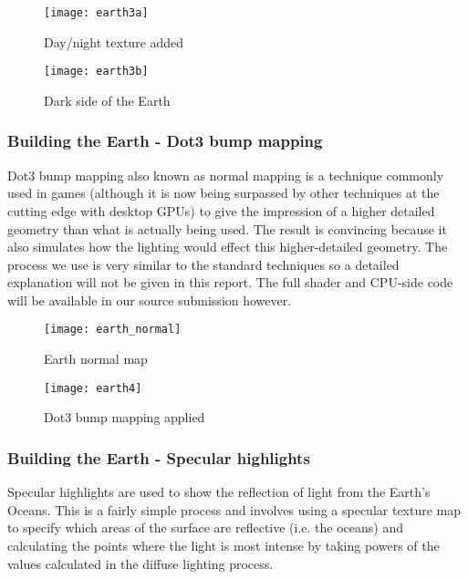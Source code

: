 \begin{figure}[!htbp]
\centering
\begin{minipage}{.5\textwidth}
  \centering
  \texttt{[image: earth3a]}
  \caption{Day/night texture added}
  \label{fig:earth3a}
\end{minipage}%
\begin{minipage}{.5\textwidth}
  \centering
  \texttt{[image: earth3b]}
  \caption{Dark side of the Earth}
  \label{fig:earth3b}
\end{minipage}
\end{figure}

\pagebreak
\subsubsection{Building the Earth - Dot3 bump mapping}

Dot3 bump mapping also known as normal mapping is a technique commonly used in games (although it is now being surpassed by other techniques at the cutting edge with desktop GPUs) to give the impression of a higher detailed geometry than what is actually being used. The result is convincing because it also simulates how the lighting would effect this higher-detailed geometry. The process we use is very similar to the standard techniques so a detailed explanation will not be given in this report. The full shader and CPU-side code will be available in our source submission however.

\begin{figure}[!htbp]
\centering
\begin{minipage}{.5\textwidth}
  \centering
  \texttt{[image: earth\_normal]}
  \caption{Earth normal map}
  \label{fig:earth4a}
\end{minipage}%
\begin{minipage}{.5\textwidth}
  \centering
  \texttt{[image: earth4]}
  \caption{Dot3 bump mapping applied}
  \label{fig:earth4b}
\end{minipage}
\end{figure}

\subsubsection{Building the Earth - Specular highlights}

Specular highlights are used to show the reflection of light from the Earth's Oceans. This is a fairly simple process and involves using a specular texture map to specify which areas of the surface are reflective (i.e. the oceans) and calculating the points where the light is most intense by taking powers of the values calculated in the diffuse lighting process.

